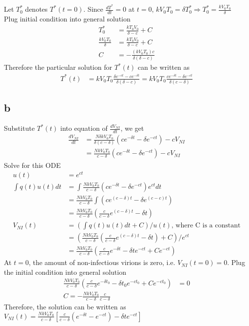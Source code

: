 \documentclass[11pt,letterpaper]{article}
\begin{document}
\noindent Let $T^*_0$ denotes $T^*(t = 0)$. Since $\frac{dT^*}{dt} = 0$ at $t = 0$, $k V_0 T_0 = \delta T^*_0 \Rightarrow T^*_0 = \frac{k V_0 T_0}{\delta}$ \\

\noindent Plug initial condition into general solution
\begin{align*}
T^*_0 &= \frac{k T_0 V_0 }{\delta - c} + C \\
\frac{k V_0 T_0}{\delta} &= \frac{k T_0 V_0 }{\delta - c} + C \\
C &= - \frac{(k V_0 T_0) c}{\delta (\delta - c)}
\end{align*}
\noindent Therefore the particular solution for $T^*(t)$ can be written as 
\begin{align*}
T^*(t) &= k V_0 T_0 \frac{\delta e^{-ct} - ce^{-\delta t}}{\delta (\delta - c) } = k V_0 T_0 \frac{c e^{-\delta t} - \delta e^{-c t}}{\delta (c - \delta)}
\end{align*}

\subsection*{b}
Substitute $T^*(t)$ into equation of $\frac{dV_{NI}}{dt}$, we get 
\begin{align*}
\frac{dV_{NI}}{dt} &= \frac{N \delta k V_0 T_0}{\delta (c - \delta)}  (c e^{-\delta t} - \delta e^{-c t})- c V_{NI} \\
&= \frac{N k V_0 T_0}{c - \delta}  (c e^{-\delta t} - \delta e^{-c t})- c V_{NI} 
\end{align*}
\noindent Solve for this ODE
\begin{align*}
u(t) &= e^{ct} \\
\int q(t) u(t) dt &= \int \frac{N k V_0 T_0}{c - \delta}  (c e^{-\delta t} - \delta e^{-c t}) e^{ct} dt \\
&= \frac{N k V_0 T_0}{c - \delta} \int  (c e^{(c - \delta) t} - \delta e^{(c - c)t}) \\
&= \frac{N k V_0 T_0}{c - \delta} (\frac{c}{c - \delta} e^{(c - \delta)t} - \delta t) \\
V_{NI}(t) &= (\int q(t) u(t) dt + C) / u(t) \text{, where C is a constant}\\
&= (\frac{N k V_0 T_0}{c - \delta} (\frac{c}{c - \delta} e^{(c - \delta)t} - \delta t) + C) / e^{ct} \\
&= \frac{N k V_0 T_0}{c - \delta}  (\frac{c}{c - \delta} e^{ - \delta t} - \delta t e^{-ct} + C e^{-ct})
\end{align*}
\noindent At $t = 0$, the amount of non-infectious virions is zero, i.e. $V_{NI} (t = 0) = 0$. Plug the initial condition into general solution
\begin{align*}
\frac{N k V_0 T_0}{c - \delta}  (\frac{c}{c - \delta} e^{ - \delta t_0} - \delta t_0 e^{-ct_0} + C e^{-ct_0}) &= 0 \\
C =  - \frac{N k V_0 T_0}{c - \delta} \frac{c}{c - \delta}
\end{align*}
\noindent Therefore, the solution can be written as $V_{NI}(t) = \frac{N k V_0 T_0}{c - \delta} [\frac{c}{c - \delta} (e^{-\delta t} - e^{-ct}) - \delta t e^{-ct}]$
\end{document}
